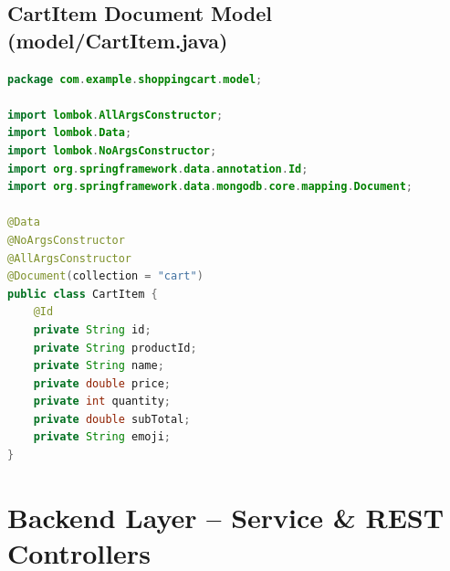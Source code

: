 \documentclass[11pt,a4paper]{article}
\begin{document}
\subsection{CartItem Document Model (model/CartItem.java)}
\begin{lstlisting}[language=java]
package com.example.shoppingcart.model;

import lombok.AllArgsConstructor;
import lombok.Data;
import lombok.NoArgsConstructor;
import org.springframework.data.annotation.Id;
import org.springframework.data.mongodb.core.mapping.Document;

@Data
@NoArgsConstructor
@AllArgsConstructor
@Document(collection = "cart")
public class CartItem {
    @Id
    private String id;
    private String productId;
    private String name;
    private double price;
    private int quantity;
    private double subTotal;
    private String emoji;
}
\end{lstlisting}

\section{Backend Layer -- Service \& REST Controllers}
\end{document}
